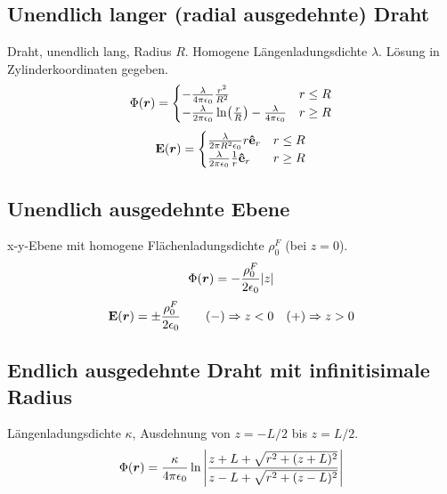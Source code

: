     \subsection{Unendlich langer (radial ausgedehnte) Draht}
      Draht, unendlich lang, Radius $R$. Homogene Längenladungsdichte 
      $\lambda$. Lösung in Zylinderkoordinaten gegeben. 
      \begin{equation}
        \Phi(\vb*r)=
        \begin{cases}
          -\frac{\lambda}{4\pi\epsilon_0}\frac{r^2}{R^2}  &r\le R\\
          -\frac{\lambda}{2\pi\epsilon_0}\ln(\frac{r}{R})
          -\frac{\lambda}{4\pi\epsilon_0} &r\ge R\\
        \end{cases}
      \end{equation}
      \begin{equation}
        \vb E(\vb*r) =
        \begin{cases}
          \frac{\lambda}{2\pi R^2\epsilon_0}r{\vu{e}}_{r} & r\le R\\
          \frac{\lambda}{2\pi\epsilon_0}\frac{1}{r}{\vu{e}}_{r} & r\ge R
        \end{cases}
      \end{equation}

    \subsection{Unendlich ausgedehnte Ebene}
    x-y-Ebene mit homogene Flächenladungsdichte $\rho_0^F$ (bei $z=0$).
    \begin{equation}
      \Phi(\vb*r)=-\frac{\rho_0^F}{2\epsilon_0}\abs{z} 
    \end{equation}
    \begin{equation*}
      \vb E(\vb*r)=\pm \frac{\rho_0^F}{2\epsilon_0}\qquad (-) \Rightarrow
      z<0\quad (+)\Rightarrow z>0
    \end{equation*}

    \subsection{Endlich ausgedehnte Draht mit infinitisimale Radius}
    Längenladungsdichte $\kappa$, Ausdehnung von $z=-L/2$ bis $z=L/2$.
    \begin{equation}
      \Phi(\vb*r)=\frac{\kappa}{4\pi\epsilon_0} 
      \ln\abs{
        \frac{z+L+\sqrt{r^2+(z+L)^2}}
        {z-L+\sqrt{r^2+(z-L)^2}} 
      }
    \end{equation}

